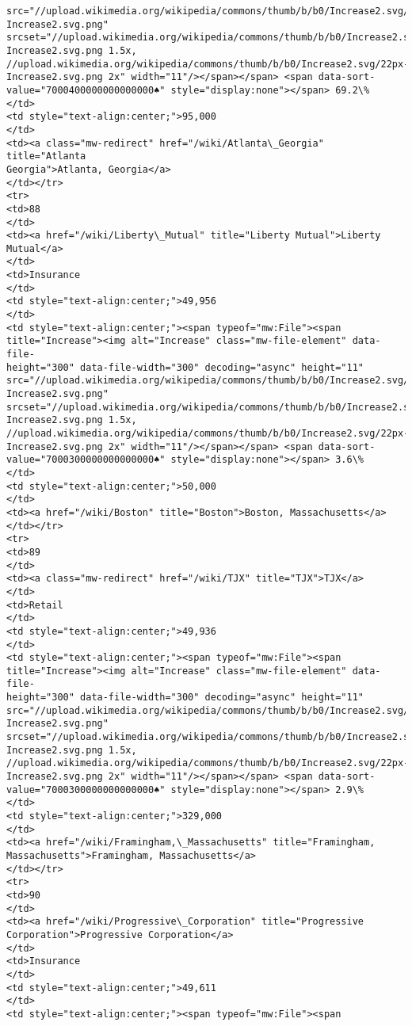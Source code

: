 \documentclass[11pt]{article}
\begin{document}
\begin{Verbatim}[commandchars=\\\{\}]
src="//upload.wikimedia.org/wikipedia/commons/thumb/b/b0/Increase2.svg/11px-
Increase2.svg.png"
srcset="//upload.wikimedia.org/wikipedia/commons/thumb/b/b0/Increase2.svg/17px-
Increase2.svg.png 1.5x,
//upload.wikimedia.org/wikipedia/commons/thumb/b/b0/Increase2.svg/22px-
Increase2.svg.png 2x" width="11"/></span></span> <span data-sort-
value="7000400000000000000♠" style="display:none"></span> 69.2\%
</td>
<td style="text-align:center;">95,000
</td>
<td><a class="mw-redirect" href="/wiki/Atlanta\_Georgia" title="Atlanta
Georgia">Atlanta, Georgia</a>
</td></tr>
<tr>
<td>88
</td>
<td><a href="/wiki/Liberty\_Mutual" title="Liberty Mutual">Liberty Mutual</a>
</td>
<td>Insurance
</td>
<td style="text-align:center;">49,956
</td>
<td style="text-align:center;"><span typeof="mw:File"><span
title="Increase"><img alt="Increase" class="mw-file-element" data-file-
height="300" data-file-width="300" decoding="async" height="11"
src="//upload.wikimedia.org/wikipedia/commons/thumb/b/b0/Increase2.svg/11px-
Increase2.svg.png"
srcset="//upload.wikimedia.org/wikipedia/commons/thumb/b/b0/Increase2.svg/17px-
Increase2.svg.png 1.5x,
//upload.wikimedia.org/wikipedia/commons/thumb/b/b0/Increase2.svg/22px-
Increase2.svg.png 2x" width="11"/></span></span> <span data-sort-
value="7000300000000000000♠" style="display:none"></span> 3.6\%
</td>
<td style="text-align:center;">50,000
</td>
<td><a href="/wiki/Boston" title="Boston">Boston, Massachusetts</a>
</td></tr>
<tr>
<td>89
</td>
<td><a class="mw-redirect" href="/wiki/TJX" title="TJX">TJX</a>
</td>
<td>Retail
</td>
<td style="text-align:center;">49,936
</td>
<td style="text-align:center;"><span typeof="mw:File"><span
title="Increase"><img alt="Increase" class="mw-file-element" data-file-
height="300" data-file-width="300" decoding="async" height="11"
src="//upload.wikimedia.org/wikipedia/commons/thumb/b/b0/Increase2.svg/11px-
Increase2.svg.png"
srcset="//upload.wikimedia.org/wikipedia/commons/thumb/b/b0/Increase2.svg/17px-
Increase2.svg.png 1.5x,
//upload.wikimedia.org/wikipedia/commons/thumb/b/b0/Increase2.svg/22px-
Increase2.svg.png 2x" width="11"/></span></span> <span data-sort-
value="7000300000000000000♠" style="display:none"></span> 2.9\%
</td>
<td style="text-align:center;">329,000
</td>
<td><a href="/wiki/Framingham,\_Massachusetts" title="Framingham,
Massachusetts">Framingham, Massachusetts</a>
</td></tr>
<tr>
<td>90
</td>
<td><a href="/wiki/Progressive\_Corporation" title="Progressive
Corporation">Progressive Corporation</a>
</td>
<td>Insurance
</td>
<td style="text-align:center;">49,611
</td>
<td style="text-align:center;"><span typeof="mw:File"><span

\end{Verbatim}
\end{document}

